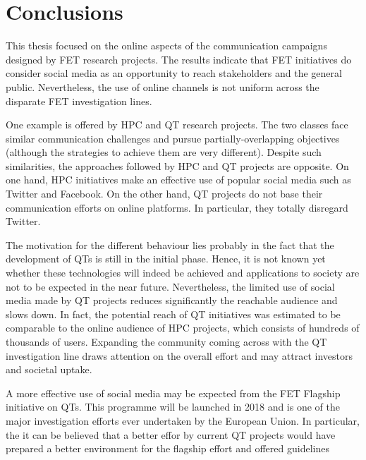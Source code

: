 \chapter*{Conclusions}
This thesis focused on the online aspects of the communication campaigns designed by FET research projects. The results indicate that FET initiatives do consider social media as an opportunity to reach stakeholders and the general public. Nevertheless, the use of online channels is not uniform across the disparate FET investigation lines.  

One example is offered by HPC and QT research projects. The two classes face similar communication challenges and pursue partially-overlapping objectives (although the strategies to achieve them are very different). Despite such similarities, the approaches followed by HPC and QT projects are opposite. On one hand, HPC initiatives make an effective use of popular social media such as Twitter and Facebook. On the other hand, QT projects do not base their communication efforts on online platforms. In particular, they totally disregard Twitter.  

The motivation for the different behaviour lies probably in the fact that the development of QTs is still in the initial phase. Hence, it is not known yet whether these technologies will indeed be achieved and applications to society are not to be expected in the near future. Nevertheless, the limited use of social media made by QT projects reduces significantly the reachable audience and slows down. In fact, the potential reach of QT initiatives was estimated to be comparable to the online audience of HPC projects, which consists of hundreds of thousands of users. Expanding the community coming across with the QT investigation line draws attention on the overall effort and may attract investors and societal uptake.

A more effective use of social media may be expected from the FET Flagship initiative on QTs. This programme will be launched in 2018 and is one of the major investigation efforts ever undertaken by the European Union. In particular, the   it can be believed that a better effor by current QT projects would have prepared a better environment for the flagship effort and offered guidelines